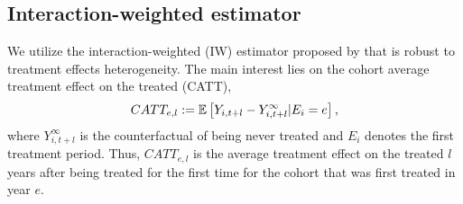 \subsection{Interaction-weighted estimator}

We utilize the interaction-weighted (IW) estimator proposed by \cite{Sun_2021} that is robust to treatment effects heterogeneity. The main interest lies on the cohort average treatment effect on the treated (CATT),
\begin{align*}
	CATT_{e, l} := \mathbb{E} \left[ Y_{i, t+l} - Y_{i, t+l}^{\infty} | E_i = e \right],
\end{align*}
where $Y_{i, t+l}^{\infty}$ is the counterfactual of being never treated and $E_i$ denotes the first treatment period. Thus, $CATT_{e, l}$ is the average treatment effect on the treated $l$ years after being treated for the first time for the cohort that was first treated in year $e$.

